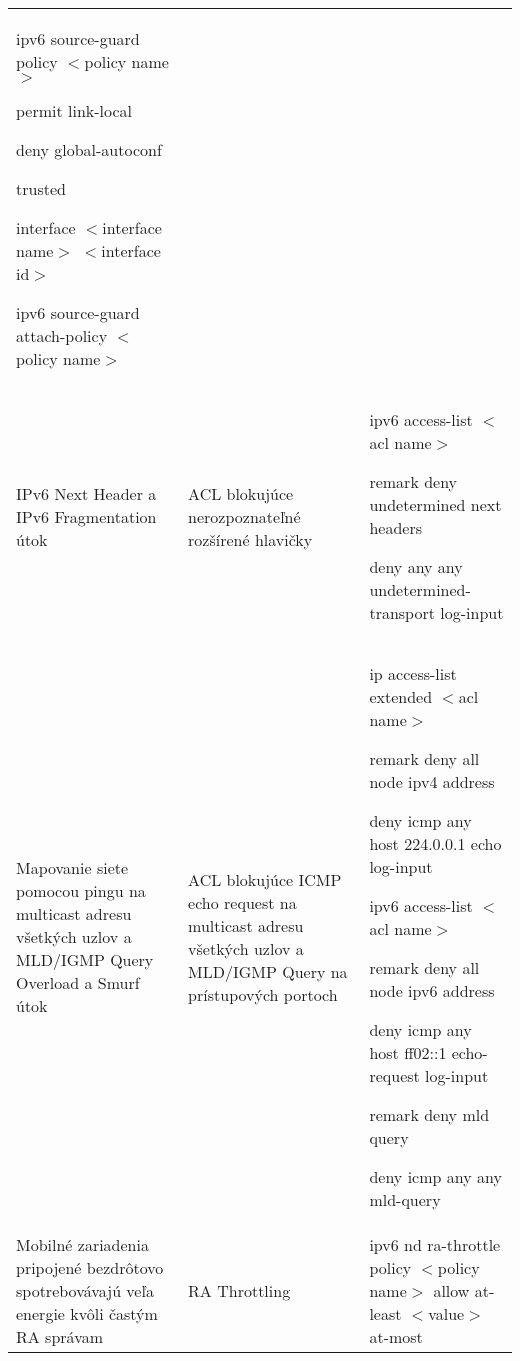 \begin{longtable}[!htbp]{|L{10em}L{10em}>{\selectfont}L{34em}|}
	ipv6 source-guard policy $<$policy name$>$
	
	\hspace{0.5em}permit link-local
	
	\hspace{0.5em}deny global-autoconf
	
	\hspace{0.5em}trusted
	
	interface $<$interface name$>$ $<$interface id$>$
	
	\hspace{0.5em}ipv6 source-guard attach-policy $<$policy name$>$\\
	
	
	
	
	IPv6 Next Header  a IPv6 Fragmentation útok	&ACL blokujúce nerozpoznateľné rozšírené hlavičky	&ipv6 access-list $<$acl name$>$
	
	\hspace{0.5em}remark deny undetermined next headers
	
	\hspace{0.5em}deny any any undetermined-transport log-input\\
	
	
	
	
	Mapovanie siete pomocou pingu na multicast adresu všetkých uzlov a MLD/IGMP Query Overload a Smurf útok	& ACL blokujúce ICMP echo request na multicast adresu všetkých uzlov a MLD/IGMP Query na prístupových portoch	&ip access-list extended $<$acl name$>$
	
	\hspace{0.5em}remark deny all node ipv4 address
	
	\hspace{0.5em}deny icmp any host 224.0.0.1 echo log-input
	
	
	ipv6 access-list $<$acl name$>$
	
	\hspace{0.5em}remark deny all node ipv6 address
	
	\hspace{0.5em}deny icmp any host ff02::1 echo-request log-input
	
	\hspace{0.5em}remark deny mld query
	
	\hspace{0.5em}deny icmp any any mld-query\\
	
	
	
	
	Mobilné zariadenia pripojené bezdrôtovo spotrebovávajú veľa energie kvôli častým RA správam	&RA Throttling	&ipv6 nd ra-throttle policy $<$policy name$>$
	allow at-least $<$value$>$ at-most 
	

\end{longtable}
